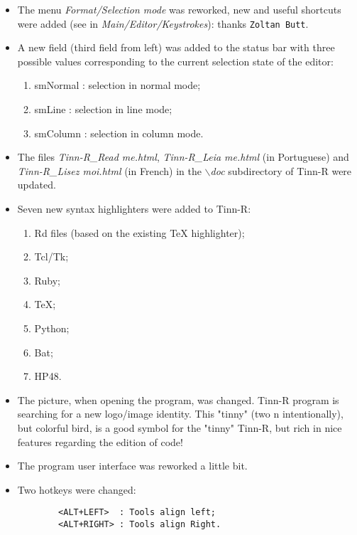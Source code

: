 \begin{itemize}
  \item The menu \textit{Format/Selection mode} was reworked, new
    and useful shortcuts were added (see in
    \textit{Main/Editor/Keystrokes}): thanks \texttt{Zoltan Butt}.
  \item A new field (third field from left) was added to the
    status bar with three possible values corresponding to the
    current selection state of the editor:
    \begin{enumerate}
      \item smNormal : selection in normal mode;
      \item smLine   : selection in line mode;
      \item smColumn : selection in column mode.
    \end{enumerate}
  \item The files \textit{Tinn-R\_Read me.html},
    \textit{Tinn-R\_Leia me.html} (in Portuguese) and
    \textit{Tinn-R\_Lisez moi.html} (in French) in the
    \textit{$\backslash$doc} subdirectory of Tinn-R were updated.
  \item Seven new syntax highlighters were added to Tinn-R:
    \begin{footnotesize}
      \begin{enumerate}
        \item Rd files (based on the existing TeX highlighter);
        \item Tcl/Tk;
        \item Ruby;
        \item TeX;
        \item Python;
        \item Bat;
        \item HP48.
      \end{enumerate}
    \end{footnotesize}
  \item The picture, when opening the program, was changed.
    Tinn-R program is searching for a new logo/image identity.
    This "tinny" (two n intentionally), but colorful
    bird, is a good symbol for the "tinny" Tinn-R, but rich
    in nice features regarding the edition of \RR{} code!
  \item The program user interface was reworked a little bit.
  \item Two hotkeys were changed:

    \begin{footnotesize}
      \begin{verbatim}
        <ALT+LEFT>  : Tools align left;
        <ALT+RIGHT> : Tools align Right.
      \end{verbatim}
    \end{footnotesize}


\end{itemize}
